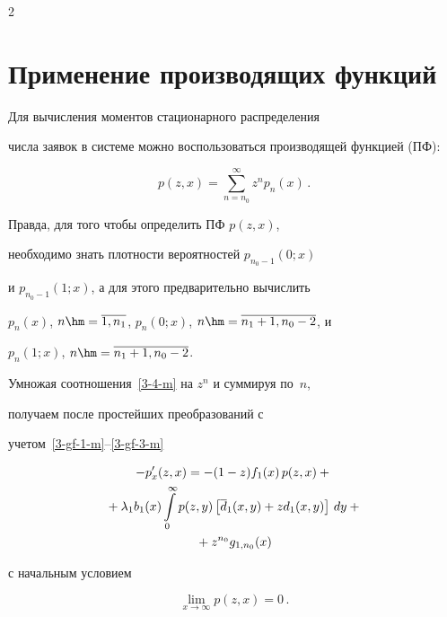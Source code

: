 \begin{multicols}{2}
\section{Применение производящих функций}





Для вычисления моментов стационарного распределения


числа заявок в системе можно воспользоваться производящей функцией (ПФ):


$$


p(z,x) = \sum\limits_{n=n_0}^\infty z^n p_n(x)\,.


$$


Правда, для того чтобы определить ПФ $p(z,x)$,


необходимо знать плотности вероятностей $p_{n_0-1}(0;x)$


и $p_{n_0-1}(1;x)$, а для этого предварительно вы\-чис\-лить


$p_{n}(x)$, $n\hm=\overline{1,n_1}$, $p_{n}(0;x)$, $n\hm=\overline{n_1+1,n_0-2}$, и


$p_{n}(1;x)$, $n\hm=\overline{n_1+1,n_0-2}$.





Умножая соотношения~\eqref{3-4-m} на $z^n$ и суммируя по~$n$, 


получаем после простейших преобразований с


учетом~\eqref{3-gf-1-m}--\eqref{3-gf-3-m}


\begin{multline}


\label{3.pf-m}


- p'_{x}(z,x) = - (1-z) f_1(x)\, p(z,x) +{}\\


{}+ \lambda_1 b_1(x)


\int\limits_0^\infty p(z,y) \left[\d_1(x,y) + z d_1(x,y)\right]\, dy


+{}\\


{}+


z^{n_0} g_{1,n_0}(x) 


\end{multline}


с начальным условием


\begin{equation}


\label{3.pf-b-m}


\lim_{x\to\infty} p(z,x) = 0\,.



\end{equation}
\end{multicols}
